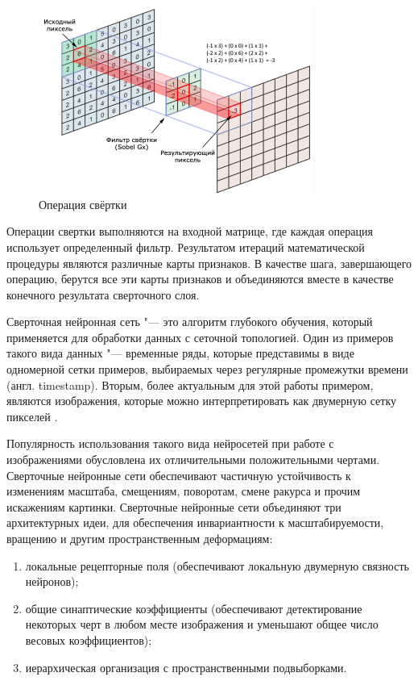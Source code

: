 \documentclass[bachelor, och, coursework]{SCWorks}
\begin{document}
        \begin{figure}[H]
            \centering
            \includegraphics[width=0.8\textwidth]{pics/convolute.png}
            \caption{Операция свёртки \cite{cnnpic}}
        \end{figure}

        Операции свертки выполняются на входной матрице, где каждая операция
        использует определенный фильтр. Результатом итераций математической
        процедуры являются различные карты признаков. В качестве шага,
        завершающего операцию, берутся все эти карты признаков и объединяются
        вместе в качестве конечного результата сверточного слоя.

        Сверточная нейронная сеть "--- это алгоритм глубокого обучения, который
        применяется для обработки данных с сеточной топологией. Один из примеров
        такого вида данных "--- временные ряды, которые представимы в виде
        одномерной сетки примеров, выбираемых через регулярные промежутки
        времени (англ. timestamp). Вторым, более актуальным для этой работы
        примером, являются изображения, которые можно интерпретировать как
        двумерную сетку пикселей \cite{cnn2}.

        Популярность использования такого вида нейросетей при работе с
        изображениями обусловлена их отличительными положительными чертами.
        Сверточные нейронные сети обеспечивают частичную устойчивость к
        изменениям масштаба, смещениям, поворотам, смене ракурса и прочим
        искажениям картинки. Сверточные нейронные сети объединяют три
        архитектурных идеи, для обеспечения инвариантности к масштабируемости,
        вращению и другим пространственным деформациям:

        \begin{enumerate}
            \item
                локальные рецепторные поля (обеспечивают локальную двумерную
                связность нейронов);
            \item
                общие синаптические коэффициенты (обеспечивают детектирование
                некоторых черт в любом месте изображения и уменьшают общее число
                весовых коэффициентов);
            \item
                иерархическая организация с пространственными подвыборками.
        \end{enumerate}
\end{document}
